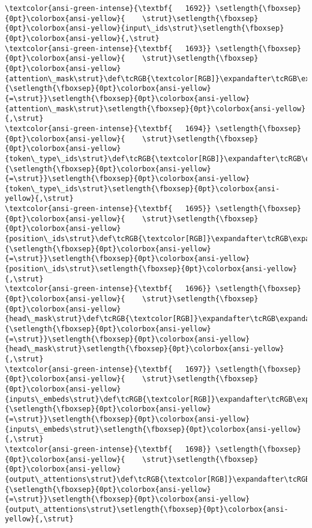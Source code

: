 \documentclass[11pt]{article}
\begin{document}
\begin{Verbatim}[commandchars=\\\{\}, frame=single, framerule=2mm, rulecolor=\color{outerrorbackground}]
\textcolor{ansi-green-intense}{\textbf{   1692}} \setlength{\fboxsep}{0pt}\colorbox{ansi-yellow}{    \strut}\setlength{\fboxsep}{0pt}\colorbox{ansi-yellow}{input\_ids\strut}\setlength{\fboxsep}{0pt}\colorbox{ansi-yellow}{,\strut}
\textcolor{ansi-green-intense}{\textbf{   1693}} \setlength{\fboxsep}{0pt}\colorbox{ansi-yellow}{    \strut}\setlength{\fboxsep}{0pt}\colorbox{ansi-yellow}{attention\_mask\strut}\def\tcRGB{\textcolor[RGB]}\expandafter\tcRGB\expandafter{\detokenize{98,98,98}}{\setlength{\fboxsep}{0pt}\colorbox{ansi-yellow}{=\strut}}\setlength{\fboxsep}{0pt}\colorbox{ansi-yellow}{attention\_mask\strut}\setlength{\fboxsep}{0pt}\colorbox{ansi-yellow}{,\strut}
\textcolor{ansi-green-intense}{\textbf{   1694}} \setlength{\fboxsep}{0pt}\colorbox{ansi-yellow}{    \strut}\setlength{\fboxsep}{0pt}\colorbox{ansi-yellow}{token\_type\_ids\strut}\def\tcRGB{\textcolor[RGB]}\expandafter\tcRGB\expandafter{\detokenize{98,98,98}}{\setlength{\fboxsep}{0pt}\colorbox{ansi-yellow}{=\strut}}\setlength{\fboxsep}{0pt}\colorbox{ansi-yellow}{token\_type\_ids\strut}\setlength{\fboxsep}{0pt}\colorbox{ansi-yellow}{,\strut}
\textcolor{ansi-green-intense}{\textbf{   1695}} \setlength{\fboxsep}{0pt}\colorbox{ansi-yellow}{    \strut}\setlength{\fboxsep}{0pt}\colorbox{ansi-yellow}{position\_ids\strut}\def\tcRGB{\textcolor[RGB]}\expandafter\tcRGB\expandafter{\detokenize{98,98,98}}{\setlength{\fboxsep}{0pt}\colorbox{ansi-yellow}{=\strut}}\setlength{\fboxsep}{0pt}\colorbox{ansi-yellow}{position\_ids\strut}\setlength{\fboxsep}{0pt}\colorbox{ansi-yellow}{,\strut}
\textcolor{ansi-green-intense}{\textbf{   1696}} \setlength{\fboxsep}{0pt}\colorbox{ansi-yellow}{    \strut}\setlength{\fboxsep}{0pt}\colorbox{ansi-yellow}{head\_mask\strut}\def\tcRGB{\textcolor[RGB]}\expandafter\tcRGB\expandafter{\detokenize{98,98,98}}{\setlength{\fboxsep}{0pt}\colorbox{ansi-yellow}{=\strut}}\setlength{\fboxsep}{0pt}\colorbox{ansi-yellow}{head\_mask\strut}\setlength{\fboxsep}{0pt}\colorbox{ansi-yellow}{,\strut}
\textcolor{ansi-green-intense}{\textbf{   1697}} \setlength{\fboxsep}{0pt}\colorbox{ansi-yellow}{    \strut}\setlength{\fboxsep}{0pt}\colorbox{ansi-yellow}{inputs\_embeds\strut}\def\tcRGB{\textcolor[RGB]}\expandafter\tcRGB\expandafter{\detokenize{98,98,98}}{\setlength{\fboxsep}{0pt}\colorbox{ansi-yellow}{=\strut}}\setlength{\fboxsep}{0pt}\colorbox{ansi-yellow}{inputs\_embeds\strut}\setlength{\fboxsep}{0pt}\colorbox{ansi-yellow}{,\strut}
\textcolor{ansi-green-intense}{\textbf{   1698}} \setlength{\fboxsep}{0pt}\colorbox{ansi-yellow}{    \strut}\setlength{\fboxsep}{0pt}\colorbox{ansi-yellow}{output\_attentions\strut}\def\tcRGB{\textcolor[RGB]}\expandafter\tcRGB\expandafter{\detokenize{98,98,98}}{\setlength{\fboxsep}{0pt}\colorbox{ansi-yellow}{=\strut}}\setlength{\fboxsep}{0pt}\colorbox{ansi-yellow}{output\_attentions\strut}\setlength{\fboxsep}{0pt}\colorbox{ansi-yellow}{,\strut}

\end{Verbatim}
\end{document}
